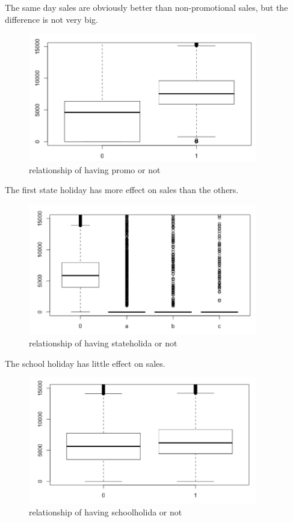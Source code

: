 \documentclass[12pt]{article}
\begin{document}
The same day sales are obviously better than non-promotional sales, but the difference is not very big.

\begin{figure}[h]
\centering
\includegraphics[width=10cm]{image/relationship_of_having_promo_or_not.png}
\caption{relationship of having promo or not}
\label{fig9}
\end{figure}


\newpage
The first state holiday has more effect on sales than the others.

\begin{figure}[h]
\centering
\includegraphics[width=10cm]{image/relationship_of_having_stateholiday_or_not.png}
\caption{relationship of having stateholida or not}
\label{fig10}
\end{figure}



The school holiday has little effect on sales.


\begin{figure}[h]
\centering
\includegraphics[width=10cm]{image/relationship_of_having_schoolholiday_or_not.png}
\caption{relationship of having schoolholida or not}
\label{fig10}
\end{figure}
\end{document}
